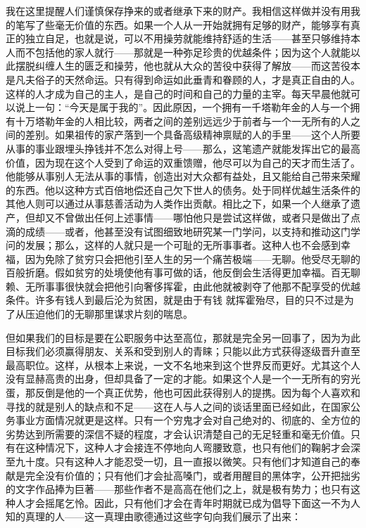 \documentclass[12pt,oneside]{book}
\begin{document}
我在这里提醒人们谨慎保存挣来的或者继承下来的财产。我相信这样做并没有用我的笔写了些毫无价值的东西。如果一个人从一开始就拥有足够的财产，能够享有真正的独立自足，也就是说，可以不用操劳就能维持舒适的生活——甚至只够维持本人而不包括他的家人就行——那就是一种弥足珍贵的优越条件；因为这个人就能以此摆脱纠缠人生的匮乏和操劳，他也就从大众的苦役中获得了解放——而这苦役本是凡夫俗子的天然命运。只有得到命运如此垂青和眷顾的人，才是真正自由的人。这样的人才成为自己的主人，是自己的时间和自己的力量的主宰。每天早晨他就可以说上一句：“今天是属于我的”。因此原因，一个拥有一千塔勒年金的人与一个拥有十万塔勒年金的人相比较，两者之间的差别远远少于前者与一个一无所有的人之间的差别。如果祖传的家产落到一个具备高级精神禀赋的人的手里——这个人所要从事的事业跟埋头挣钱并不怎么对得上号——那么，这笔遗产就能发挥出它的最高价值，因为现在这个人受到了命运的双重馈赠，他尽可以为自己的天才而生活了。他能够从事别人无法从事的事情，创造出对大众都有益处，且又能给自己带来荣耀的东西。他以这种方式百倍地偿还自己欠下世人的债务。处于同样优越生活条件的其他人则可以通过从事慈善活动为人类作出贡献。相比之下，如果一个人继承了遗产，但却又不曾做出任何上述事情——哪怕他只是尝试这样做，或者只是做出了点滴的成绩——或者，他甚至没有试图细致地研究某一门学问，以支持和推动这门学问的发展；那么，这样的人就只是一个可耻的无所事事者。这种人也不会感到幸福，因为免除了贫穷只会把他引至人生的另一个痛苦极端——无聊。他受尽无聊的百般折磨。假如贫穷的处境使他有事可做的话，他反倒会生活得更加幸福。百无聊赖、无所事事很快就会把他引向奢侈挥霍，由此他就被剥夺了他那不配享受的优越条件。许多有钱人到最后沦为贫困，就是由于有钱
就挥霍殆尽，目的只不过是为了从压迫他们的无聊那里谋求片刻的喘息。 

但如果我们的目标是要在公职服务中达至高位，那就是完全另一回事了，因为为此目标我们必须赢得朋友、关系和受到别人的青睐；只能以此方式获得逐级晋升直至最高职位。这样，从根本上来说，一文不名地来到这个世界反而更好。尤其这个人没有显赫高贵的出身，但却具备了一定的才能。如果这个人是一个一无所有的穷光蛋，那反倒是他的一个真正优势，他也可因此获得别人的提携。因为每个人喜欢和寻找的就是别人的缺点和不足——这在人与人之间的谈话里面已经如此，在国家公务事业方面情况就更是这样。只有一个穷鬼才会对自己绝对的、彻底的、全方位的劣势达到所需要的深信不疑的程度，才会认识清楚自己的无足轻重和毫无价值。只有在这种情况下，这种人才会接连不停地向人弯腰致意，也只有他们的鞠躬才会深至九十度。只有这种人才能忍受一切，且一直报以微笑。只有他们才知道自己的奉献是完全没有价值的；只有他们才会扯高嗓门，或者用醒目的黑体字，公开把拙劣的文字作品捧为巨著——那些作者不是高高在他们之上，就是极有势力；也只有这种人才会摇尾乞怜。因此，只有他们才会在青年时期就已成为倡导下面这一不为人知的真理的人——这一真理由歌德通过这些字句向我们展示了出来： 
\end{document}
